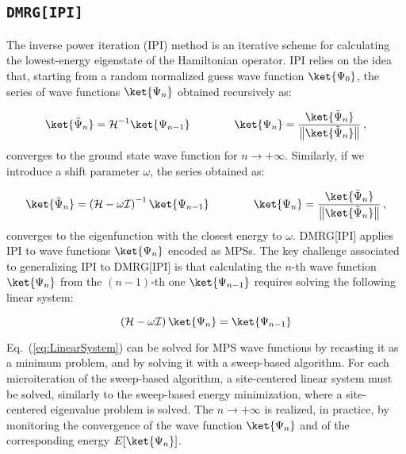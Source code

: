 \documentclass[bibliography=totoc,12pt,a4paper]{scrartcl}
\begin{document}
\subsection{\texttt{DMRG[IPI]}}
\label{subsec:DMRG-IPI}

The inverse power iteration (IPI) method is an iterative scheme for calculating the lowest-energy eigenstate of the Hamiltonian operator.
IPI relies on the idea that, starting from a random normalized guess wave function $\ket{\Psi_0}$, the series of wave functions $\ket{\Psi_n}$ obtained recursively as:

\begin{equation}
  \ket{\tilde{\Psi}_n} = \mathcal{H}^{-1} \ket{\Psi_{n-1}} \qquad \qquad
  \ket{\Psi_n} = \frac{\ket{\tilde{\Psi}_n}}{\left\| \ket{\tilde{\Psi}_n} \right\|} \, ,
  \label{eq:IPI_Series}
\end{equation}
%
converges to the ground state wave function for $n \rightarrow +\infty$.
Similarly, if we introduce a shift parameter $\omega$, the series obtained as:

\begin{equation}
  \ket{\tilde{\Psi}_n} = \left( \mathcal{H} - \omega \mathcal{I} \right)^{-1} \ket{\Psi_{n-1}} \qquad \qquad
  \ket{\Psi_n} = \frac{\ket{\tilde{\Psi}_n}}{\left\| \ket{\tilde{\Psi}_n} \right\|} \, ,
  \label{eq:IPI_Series_Shifted}
\end{equation}
%
converges to the eigenfunction with the closest energy to $\omega$.
DMRG[IPI] applies IPI to wave functions $\ket{\Psi_n}$ encoded as MPSs.
The key challenge associated to generalizing IPI to DMRG[IPI] is that calculating the $n$-th wave function $\ket{\Psi_n}$ from the $(n-1)$-th one $\ket{\Psi_{n-1}}$ requires solving the following linear system:

\begin{equation}
  \left( \mathcal{H} - \omega \mathcal{I} \right) \ket{\Psi_n} = \ket{\Psi_{n-1}}
  \label{eq:LinearSystem}
\end{equation}

Eq.~(\ref{eq:LinearSystem}) can be solved for MPS wave functions by recasting it as a minimum problem, and by solving it with a sweep-based algorithm.\cite{Rakhuba2016_vDMRG,Baiardi2022_DMRG-FEAST}
For each microiteration of the sweep-based algorithm, a site-centered linear system must be solved, similarly to the sweep-based energy minimization, where a site-centered eigenvalue problem is solved.
The $n \rightarrow +\infty$ is realized, in practice, by monitoring the convergence of the wave function $\ket{\Psi_n}$ and of the corresponding energy $E[\ket{\Psi_n}]$. \\
\end{document}
